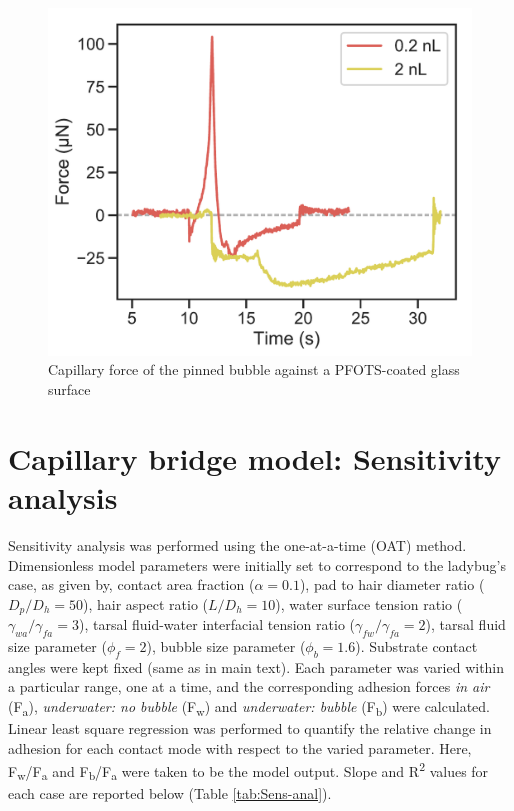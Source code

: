 \documentclass[english]{achemso}
\begin{document}
\begin{figure}[H]
\begin{centering}
\includegraphics{FigureS4-Expt_bubble_force}\caption{Capillary force of the pinned bubble against a PFOTS-coated glass surface \label{fig:Bubble_capillary_force}}
\par\end{centering}
\end{figure}

\section{Capillary bridge model: Sensitivity analysis}

Sensitivity analysis was performed using the one-at-a-time (OAT) method. Dimensionless model parameters were initially set to correspond to the ladybug's case, as given by,
contact area fraction ($\alpha=0.1$), pad to hair diameter ratio ($D_p/D_h=50$), hair aspect ratio ($L/D_{h}=10$), water surface tension ratio ($\gamma_{wa}/\gamma_{fa}=3$),
tarsal fluid-water interfacial tension ratio ($\gamma_{fw}/\gamma_{fa}=2$), tarsal fluid size parameter ($\phi_{f}=2$), bubble size parameter ($\phi_{b}=1.6$). Substrate contact angles were kept fixed (same as in main text). Each parameter was varied within a particular range, one at a time, and the corresponding adhesion forces \emph{in air} (F\textsubscript{a}),   \emph{underwater: no bubble} (F\textsubscript{w}) and \emph{underwater: bubble} (F\textsubscript{b}) were calculated. Linear least square regression was performed to quantify the relative change in adhesion for each contact mode with respect to the varied parameter. Here, F\textsubscript{w}/F\textsubscript{a} and F\textsubscript{b}/F\textsubscript{a} were taken to be the model output.
Slope and R\textsuperscript{2} values for each case are reported below (Table \ref{tab:Sens-anal}).
\end{document}
